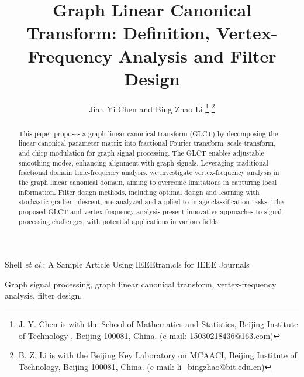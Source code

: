\documentclass[lettersize,journal]{IEEEtran}
\begin{document}
\title{Graph Linear Canonical Transform: Definition, Vertex-Frequency Analysis and Filter Design}

\author{Jian Yi Chen and Bing Zhao Li
\thanks{J. Y. Chen is with the School of Mathematics and Statistics, Beijing Institute of Technology
	, Beijing 100081, China. (e-mail: 15030218436@163.com)}%
\thanks{B. Z. Li is with the Beijing Key Laboratory on MCAACI, Beijing Institute of Technology, Beijing 100081, China. (e-mail: li\_bingzhao@bit.edu.cn)}}

%
{Shell \MakeLowercase{\textit{et al.}}: A Sample Article Using IEEEtran.cls for IEEE Journals}


\maketitle

\begin{abstract}
This paper proposes a graph linear canonical transform (GLCT) by decomposing the linear canonical parameter matrix into fractional Fourier transform, scale transform, and chirp modulation for graph signal processing. The GLCT enables adjustable smoothing modes, enhancing alignment with graph signals. Leveraging traditional fractional domain time-frequency analysis, we investigate vertex-frequency analysis in the graph linear canonical domain, aiming to overcome limitations in capturing local information. Filter design methods, including optimal design and learning with stochastic gradient descent, are analyzed and applied to image classification tasks. The proposed GLCT and vertex-frequency analysis present innovative approaches to signal processing challenges, with potential applications in various fields.
\end{abstract}

\begin{IEEEkeywords}
Graph signal processing, graph linear canonical transform, vertex-frequency analysis, filter design.
\end{IEEEkeywords}
\end{document}

